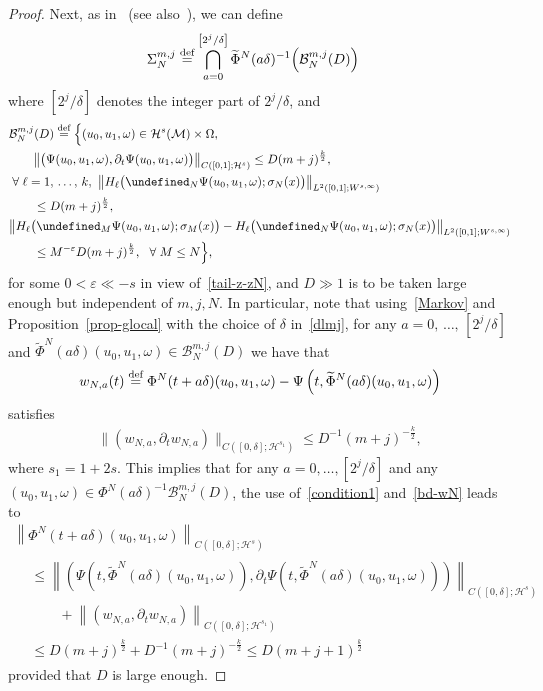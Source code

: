 \documentclass[10pt]{amsart}
\theoremstyle{definition}\newtheorem{defi}[theo]{Definition}\newtheorem{rema}[theo]{Remark}\newtheorem{exam}[theo]{Example}\newtheorem{exem}[theo]{Example}\newtheorem{nota}[theo]{Notation}
\newcommand{\deff}{\overset{\textup{def}}{=}}
\let\P= \undefined
\newcommand{\P}{\mathbf{P}}
\newcommand{\B}{\mathcal{B}}
\newcommand{\M}{\mathcal{M}}
\renewcommand{\H}{\mathcal{H}}
\newcommand{\dl}{\delta}
\newcommand{\eps}{\varepsilon}
\newcommand{\s}{\sigma}
\newcommand{\Si}{\Sigma}
\newcommand{\wt}{\widetilde}
\newcommand{\dt}{\partial_t}
\renewcommand{\o}{\omega}
\renewcommand{\O}{\Omega}
\let\oldforall\forall
\renewcommand*{\forall}{\mathrel{\oldforall}}
\begin{document}
\begin{proof}
Next, as in~\cite{BTT2} (see also~\cite{BO94,BO96}), we can define
\begin{align*}
\Si_{N}^{m,j} &
\deff \bigcap_{a=0}^{\left[2^j/\dl\right]}\wt\Phi^N(a\dl)^{-1}\Big(\B_N^{m,j}(D)\Big)
\end{align*}
where $[2^j/\dl]$ denotes the integer part of $2^j/\dl$, and
\begin{align}
&\B_N^{m,j}(D)
\deff \Big\{(u_0,u_1,\o)\in \H^s(\M)\times\O,\label{condition1}\\
&\qquad\big\|\big(\Psi(u_0,u_1,\o),\dt\Psi(u_0,u_1,\o)\big)\big\|_{C([0,1];\H^s)} \le D(m+j)^{\frac{k}2},\notag
\\
&\forall \ell=1,\,\dots,\,k,~\big\|H_{\ell}\big(\P_N\Psi(u_0,u_1,\o);\s_N(x)\big)\big\|_{L^2([0,1];W^{s,\infty})}\label{condition2}\\
&\qquad\le D(m+j)^{\frac{k}2}\notag,
\\
&\big\|H_{\ell}\big(\P_M\Psi(u_0,u_1,\o);\s_M(x)\big)\label{condition3}
-H_{\ell}\big(\P_N\Psi(u_0,u_1,\o);\s_N(x)\big)\big\|_{L^2([0,1]; W^{s,\infty})}\\
&\qquad\notag\le M^{-\eps}D(m+j)^{\frac{k}2},~~\forall M\le N\Big\},\notag
\end{align}
for some $0<\eps\ll -s$ in view of~\eqref{tail-z-zN}, and $D\gg 1$ is to be taken large enough but independent of $m,j,N$. In particular, note that using~\eqref{Markov} and Proposition~\ref{prop-glocal} with the choice of $\dl$ in~\eqref{dlmj}, for any $a=0,\,\dots,\,[2^j/\dl]$ and $\wt\Phi^N(a\dl)(u_0,u_1,\o)\in \B_N^{m,j}(D)$ we have that
\begin{align*}
w_{N,a}(t)
\deff \Phi^N(t+a\dl)(u_0,u_1,\o)-\Psi\left(t,\wt\Phi^N(a\dl)(u_0,u_1,\o)\right)
\end{align*}
satisfies
\begin{align}\label{bd-wN}
\|(w_{N,a},\dt w_{N,a})\|_{C\left([0,\dl];\H^{s_1}\right)}\le D^{-1}(m+j)^{-\frac{k}2},
\end{align}
where $s_1=1+2s$. This implies that for any $a=0,\dots,[2^j/\dl]$ and any $(u_0,u_1,\o)\in \Phi^N(a\dl)^{-1}\B_N^{m,j}(D)$, the use of~\eqref{condition1} and~\eqref{bd-wN} leads to
\begin{multline}\label{bduN}
\left\|\Phi^N(t+a\dl)(u_0,u_1,\o)\right\|_{C([0,\dl];\H^{s})}\\
\begin{aligned}
&\le \left\|\left(\Psi\left(t,\wt\Phi^N(a\dl)(u_0,u_1,\o)\right),\dt\Psi\left(t,\wt\Phi^N(a\dl)(u_0,u_1,\o)\right)\right)\right\|_{C([0,\dl];\H^s)}\\
&\qquad+\left\|\left(w_{N,a},\dt w_{N,a}\right)\right\|_{C\left([0,\dl];\H^{s_1}\right)}\\
&\le D(m+j)^{\frac{k}2}+D^{-1}(m+j)^{-\frac{k}2} \le D(m+j+1)^{\frac{k}2}
\end{aligned}
\end{multline}
provided that $D$ is large enough.


\end{proof}
\end{document}
